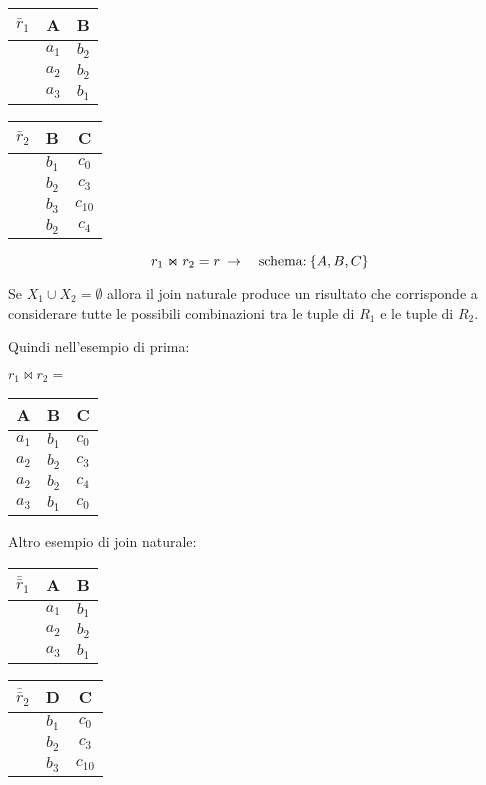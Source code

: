 \documentclass[a4paper, 10pt]{article}
\theoremstyle{definition}
\begin{document}
			\begin{multicols}{3}
				\begin{tabular}{ccc}
					$\bar{r}_1$ & A   	& B     \\
					\midrule
							    & $a_1$ & $b_2$ \\
							    & $a_2$ & $b_2$ \\
							    & $a_3$ & $b_1$
	 			\end{tabular}
	 			
	 			\columnbreak
	 			
	 			\begin{tabular}{ccc}
	 				$\bar{r}_2$ & B		& C		\\
	 				\midrule	
				 				& $b_1$ & $c_0$ \\
				 				& $b_2$ & $c_3$ \\
				 				& $b_3$ & $c_{10}$\\
				 				& $b_2$ & $c_4$
	 			\end{tabular}
	 			
	 			\columnbreak
	 			
	 			\[
		 			r_1 \Join r_2 = r \:\rightarrow \quad \textup{schema:} \: \{A,B,C\}
	 			\]
			\end{multicols}
			Se $X_1 \cup X_2 = \emptyset$ allora il join naturale produce un risultato che corrisponde a considerare tutte le possibili combinazioni tra le tuple di $R_1$ e le tuple di $R_2$.
			
			Quindi nell'esempio di prima:
			
			$r_1 \Join r_2 =$
			\begin{tabular}{ccc}
				A		& B		  & C		\\
				\midrule
			    $ a_1 $ & $ b_1 $ & $ c_0 $ \\
			    $ a_2 $ & $ b_2 $ & $ c_3 $ \\
			    $ a_2 $ & $ b_2 $ & $ c_4 $ \\
			    $ a_3 $ & $ b_1 $ & $ c_0 $
			\end{tabular}
			
			\bigskip
			
			Altro esempio di join naturale:
			
			\begin{multicols}{2}
				\begin{tabular}{ccc}
					$ \bar{\bar{r}}_1 $ & A 		& B \\
					\midrule
								  & $ a_1 $ & $ b_1 $ \\
								  & $ a_2 $ & $ b_2 $ \\
								  & $ a_3 $ & $ b_1 $
				\end{tabular}
				
				\columnbreak
				
				\begin{tabular}{ccc}
					$ \bar{\bar{r}}_2 $ & D 		& C \\
					\midrule
								  & $ b_1 $ & $ c_0 $ \\
								  & $ b_2 $ & $ c_3 $ \\
								  & $ b_3 $ & $ c_{10} $
				\end{tabular}
			\end{multicols}
			
\end{document}

